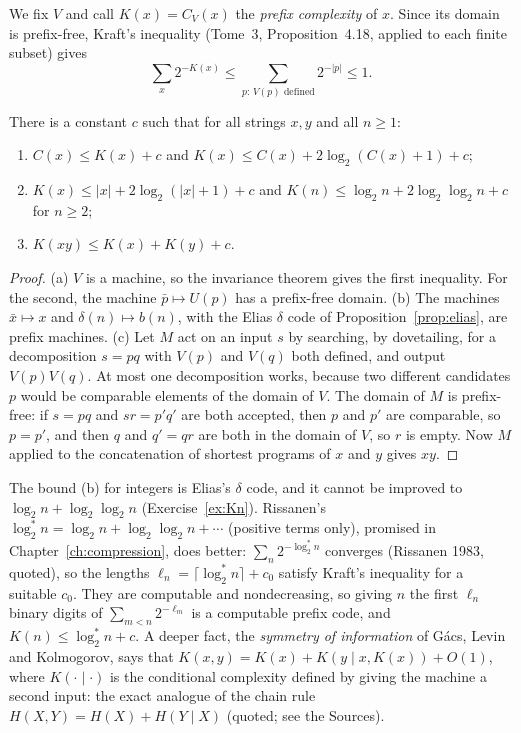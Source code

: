 We fix $V$ and call $K(x)=C_V(x)$ the \emph{prefix complexity} of $x$. Since its domain is prefix-free, Kraft's inequality (Tome~3, Proposition~4.18, applied to each finite subset) gives
\begin{equation}\label{eq:kraftK}
\sum_x2^{-K(x)}\le\sum_{p:\,V(p)\text{ defined}}2^{-|p|}\le1.
\end{equation}

\begin{proposition}\label{prop:basicK}
There is a constant $c$ such that for all strings $x,y$ and all $n\ge1$:
\begin{enumerate}[label=(\alph*)]
\item $C(x)\le K(x)+c$ and $K(x)\le C(x)+2\log_2(C(x)+1)+c$;
\item $K(x)\le|x|+2\log_2(|x|+1)+c$ and $K(n)\le\log_2n+2\log_2\log_2n+c$ for $n\ge2$;
\item $K(xy)\le K(x)+K(y)+c$.
\end{enumerate}
\end{proposition}

\begin{proof}
(a) $V$ is a machine, so the invariance theorem gives the first inequality. For the second, the machine $\bar p\mapsto U(p)$ has a prefix-free domain. (b) The machines $\bar x\mapsto x$ and $\delta(n)\mapsto b(n)$, with the Elias $\delta$ code of Proposition~\ref{prop:elias}, are prefix machines. (c) Let $M$ act on an input $s$ by searching, by dovetailing, for a decomposition $s=pq$ with $V(p)$ and $V(q)$ both defined, and output $V(p)V(q)$. At most one decomposition works, because two different candidates $p$ would be comparable elements of the domain of $V$. The domain of $M$ is prefix-free: if $s=pq$ and $sr=p'q'$ are both accepted, then $p$ and $p'$ are comparable, so $p=p'$, and then $q$ and $q'=qr$ are both in the domain of $V$, so $r$ is empty. Now $M$ applied to the concatenation of shortest programs of $x$ and $y$ gives $xy$.
\end{proof}

The bound (b) for integers is Elias's $\delta$ code, and it cannot be improved to $\log_2n+\log_2\log_2n$ (Exercise~\ref{ex:Kn}). Rissanen's $\log_2^*n=\log_2n+\log_2\log_2n+\cdots$ (positive terms only), promised in Chapter~\ref{ch:compression}, does better: $\sum_n2^{-\log_2^*n}$ converges (Rissanen 1983, quoted), so the lengths $\ell_n=\lceil\log_2^*n\rceil+c_0$ satisfy Kraft's inequality for a suitable $c_0$. They are computable and nondecreasing, so giving $n$ the first $\ell_n$ binary digits of $\sum_{m<n}2^{-\ell_m}$ is a computable prefix code, and $K(n)\le\log_2^*n+c$. A deeper fact, the \emph{symmetry of information} of Gács, Levin and Kolmogorov, says that $K(x,y)=K(x)+K(y\mid x,K(x))+O(1)$, where $K(\cdot\mid\cdot)$ is the conditional complexity defined by giving the machine a second input: the exact analogue of the chain rule $H(X,Y)=H(X)+H(Y\mid X)$ (quoted; see the Sources).

